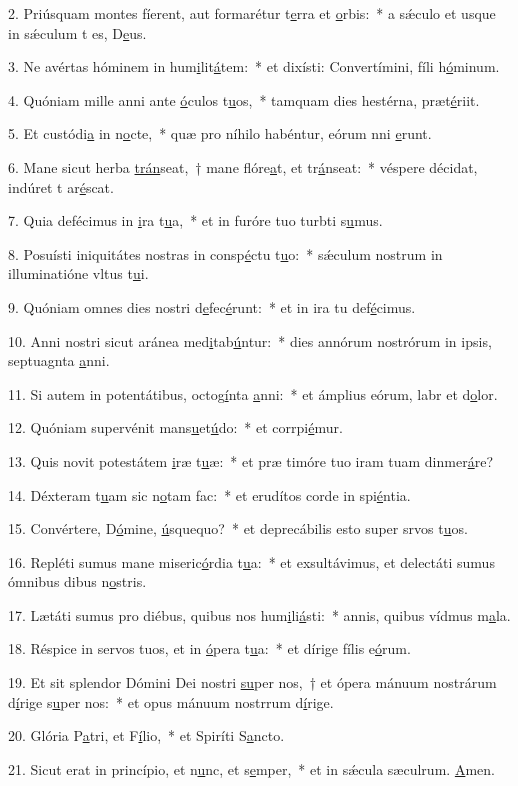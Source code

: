 2. Priúsquam montes fíerent, aut formarétur t\uline{e}rra et \uline{o}rbis:~* a sǽculo et usque in sǽculum t es, D\uline{e}us.\par 
3. Ne avértas hóminem in hum\uline{i}lit\uline{á}tem:~* et dixísti: Convertímini, fíli h\uline{ó}minum.\par 
4. Quóniam mille anni ante \uline{ó}culos t\uline{u}os,~* tamquam dies hestérna,  præt\uline{é}riit.\par 
5. Et custódi\uline{a} in n\uline{o}cte,~* quæ pro níhilo habéntur, eórum nni \uline{e}runt.\par 
6. Mane sicut herba \uline{trán}seat,~† mane flóre\uline{a}t, et tr\uline{á}nseat:~* véspere décidat, indúret t ar\uline{é}scat.\par 
7. Quia defécimus in \uline{i}ra t\uline{u}a,~* et in furóre tuo turbti s\uline{u}mus.\par 
8. Posuísti iniquitátes nostras in consp\uline{é}ctu t\uline{u}o:~* sǽculum nostrum in illuminatióne vltus t\uline{u}i.\par 
9. Quóniam omnes dies nostri d\uline{e}fec\uline{é}runt:~* et in ira tu def\uline{é}cimus.\par 
10. Anni nostri sicut aránea med\uline{i}tab\uline{ú}ntur:~* dies annórum nostrórum in ipsis, septuagnta \uline{a}nni.\par 
11. Si autem in potentátibus, octog\uline{í}nta \uline{a}nni:~* et ámplius eórum, labr et d\uline{o}lor.\par 
12. Quóniam supervénit mans\uline{u}et\uline{ú}do:~* et corrpi\uline{é}mur.\par 
13. Quis novit potestátem \uline{i}ræ t\uline{u}æ:~* et præ timóre tuo iram tuam dinmer\uline{á}re?\par 
14. Déxteram t\uline{u}am sic n\uline{o}tam fac:~* et erudítos corde in spi\uline{é}ntia.\par 
15. Convértere, D\uline{ó}mine, \uline{ú}squequo?~* et deprecábilis esto super srvos t\uline{u}os.\par 
16. Repléti sumus mane miseric\uline{ó}rdia t\uline{u}a:~* et exsultávimus, et delectáti sumus ómnibus dibus n\uline{o}stris.\par 
17. Lætáti sumus pro diébus, quibus nos hum\uline{i}li\uline{á}sti:~* annis, quibus vídmus m\uline{a}la.\par 
18. Réspice in servos tuos, et in \uline{ó}pera t\uline{u}a:~* et dírige fílis e\uline{ó}rum.\par 
19. Et sit splendor Dómini Dei nostri \uline{su}per nos,~† et ópera mánuum nostrárum d\uline{í}rige s\uline{u}per nos:~* et opus mánuum nostrrum d\uline{í}rige.\par 
20. Glória P\uline{a}tri, et F\uline{í}lio,~* et Spiríti S\uline{a}ncto.\par 
21. Sicut erat in princípio, et n\uline{u}nc, et s\uline{e}mper,~* et in sǽcula sæculrum. \uline{A}men.\par 
